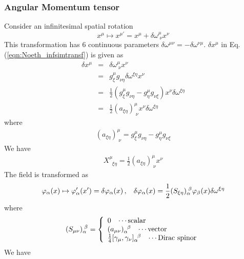 \subsubsection{Angular Momentum tensor}
Consider an infinitesimal spatial rotation
\begin{equation}
x^\mu \mapsto x^{\mu '} = x^\mu + \delta \omega^\mu_{\;\nu} x^\nu
\end{equation}
This transformation has 6 continuous parameters $\delta \omega^{\mu \nu} = -\delta \omega^{\nu \mu}$.
$\delta x^\mu$ in Eq. (\ref{eqn:Noeth_infsimtransf}) is given as
\begin{eqnarray}
\delta x^\mu &=& \delta \omega^\mu_{\;\nu} x^\nu
\nonumber\\
&=&
g^\mu_\xi g_{\nu \eta} \delta \omega^{\xi \eta} x^\nu
\nonumber\\
&=&
\frac{1}{2}( g^\mu_\xi g_{\nu \eta} - g^\mu_\eta g_{\nu \xi} ) x^\nu \delta \omega^{\xi \eta}
\nonumber\\
&=&
\frac{1}{2} (a_{\xi \eta})^\mu_{\;\nu} x^\nu \delta \omega^{\xi \eta}
\end{eqnarray}
where
\begin{eqnarray}
(a_{\xi \eta})^\mu_{\; \nu}
=
g^\mu_\xi g_{\nu \eta} - g^\mu_\eta g_{\nu \xi}
\end{eqnarray}
We have 
\begin{eqnarray}
X^\mu_{\;\;\xi \eta}
=
\frac{1}{2} (a_{\xi \eta})^\mu_{\;\nu} x^\nu
\end{eqnarray}
The field is transformed as
\begin{eqnarray}
\varphi_\alpha (x) 
\mapsto
\varphi_\alpha' (x') 
=
\delta \varphi_\alpha (x) 
\,,
\hspace{3mm}
\delta \varphi_\alpha (x) 
= 
\frac{1}{2} (S_{\xi \eta})_\alpha^{\;\beta}
\varphi_\beta (x) 
\delta \omega^{\xi \eta}
\end{eqnarray}
where
\begin{eqnarray}
(S_{\mu \nu})_\alpha^{\;\beta}
=
\left\{
\begin{array}{l}
0
\hspace{3mm}
\cdots
\mbox{scalar}
\\
(a_{\mu \nu})_\alpha^{\;\;\beta}
\hspace{3mm}
\cdots
\mbox{vector}
\\
\frac{1}{4} [ \gamma_\mu, \gamma_\nu ]_{\alpha}^{\;\;\beta}
\hspace{3mm}
\cdots
\mbox{Dirac spinor}
\end{array}
\right.
\end{eqnarray}
We have
